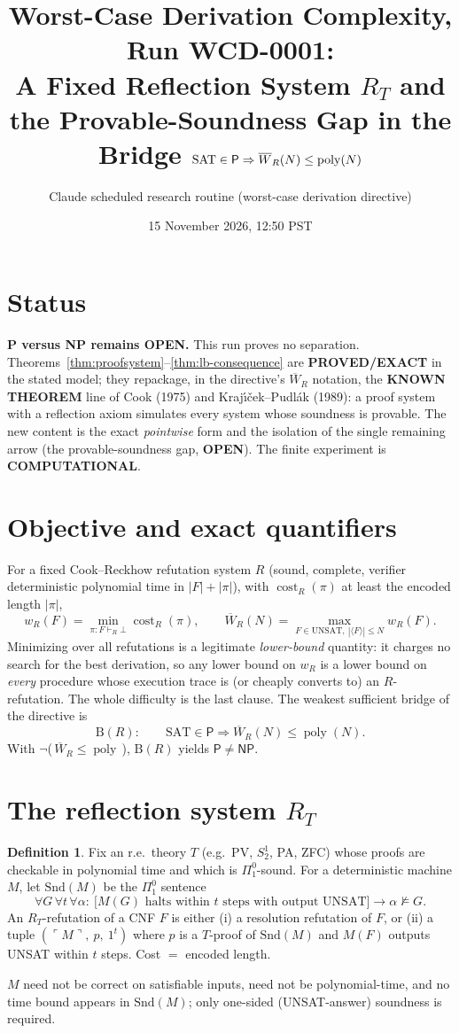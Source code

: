 \documentclass[11pt]{article}
\title{Worst-Case Derivation Complexity, Run WCD-0001:\\
A Fixed Reflection System $R_T$ and the Provable-Soundness Gap in the Bridge
$\SAT\in\mathsf P\Rightarrow\Wbar_R(N)\le\poly(N)$}
\author{Claude scheduled research routine (worst-case derivation directive)}
\date{15 November 2026, 12:50 PST}
\theoremstyle{definition}
\newtheorem{definition}[theorem]{Definition}
\newcommand{\SAT}{\mathrm{SAT}}
\newcommand{\UNSAT}{\mathrm{UNSAT}}
\newcommand{\poly}{\operatorname{poly}}
\newcommand{\Wbar}{\overline W}
\begin{document}
\maketitle

\section*{Status}
\textbf{P versus NP remains OPEN.} This run proves no separation.
Theorems~\ref{thm:proofsystem}--\ref{thm:lb-consequence} are \textbf{PROVED/EXACT}
in the stated model; they repackage, in the directive's $\Wbar_R$ notation, the
\textbf{KNOWN THEOREM} line of Cook (1975) and Kraj\'{\i}\v{c}ek--Pudl\'ak (1989):
a proof system with a reflection axiom simulates every system whose soundness is
provable. The new content is the exact \emph{pointwise} form and the isolation of
the single remaining arrow (the provable-soundness gap, \textbf{OPEN}). The finite
experiment is \textbf{COMPUTATIONAL}.

\section{Objective and exact quantifiers}
For a fixed Cook--Reckhow refutation system $R$ (sound, complete, verifier
deterministic polynomial time in $|F|+|\pi|$), with $\operatorname{cost}_R(\pi)$
at least the encoded length $|\pi|$,
\[
 w_R(F)=\min_{\pi:F\vdash_R\bot}\operatorname{cost}_R(\pi),\qquad
 \Wbar_R(N)=\max_{F\in\UNSAT,\ |\langle F\rangle|\le N} w_R(F).
\]
Minimizing over all refutations is a legitimate \emph{lower-bound} quantity: it
charges no search for the best derivation, so any lower bound on $w_R$ is a lower
bound on \emph{every} procedure whose execution trace is (or cheaply converts to)
an $R$-refutation. The whole difficulty is the last clause. The weakest sufficient
bridge of the directive is
\[
 \mathrm{B}(R):\qquad \SAT\in\mathsf P \Longrightarrow \Wbar_R(N)\le\poly(N).
\]
With $\neg$(\,$\Wbar_R\le\poly$\,), $\mathrm B(R)$ yields $\mathsf P\neq\mathsf{NP}$.

\section{The reflection system $R_T$}
\begin{definition}\label{def:RT}
Fix an r.e.\ theory $T$ (e.g.\ PV, $S^1_2$, PA, ZFC) whose proofs are checkable
in polynomial time and which is $\Pi^0_1$-sound. For a deterministic machine $M$,
let $\mathrm{Snd}(M)$ be the $\Pi^0_1$ sentence
\[
 \forall G\,\forall t\,\forall \alpha:\ \bigl[M(G)\text{ halts within $t$ steps with
 output UNSAT}\bigr]\rightarrow \alpha\not\models G .
\]
An $R_T$-refutation of a CNF $F$ is either (i) a resolution refutation of $F$, or
(ii) a tuple $(\ulcorner M\urcorner,\ p,\ 1^t)$ where $p$ is a $T$-proof of
$\mathrm{Snd}(M)$ and $M(F)$ outputs UNSAT within $t$ steps. Cost $=$ encoded
length.
\end{definition}
\noindent
$M$ need not be correct on satisfiable inputs, need not be polynomial-time, and
no time bound appears in $\mathrm{Snd}(M)$; only one-sided (UNSAT-answer)
soundness is required.
\end{document}
